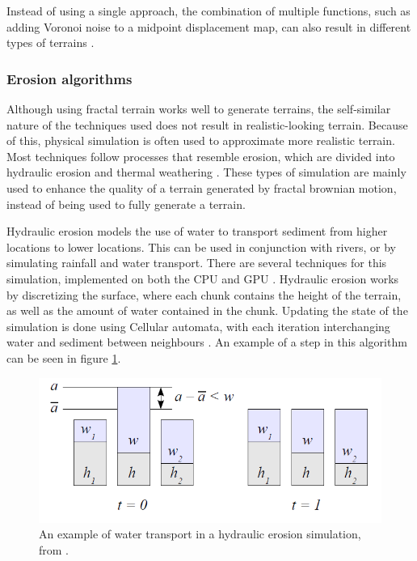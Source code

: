 \documentclass{article}
\begin{document}
Instead of using a single approach, the combination of multiple functions, such as adding Voronoi noise to a midpoint displacement map, can also result in different types of terrains \cite{olsen_realtime_2004}.

\subsubsection{Erosion algorithms}
Although using fractal terrain works well to generate terrains, the self-similar nature of the techniques used does not result in realistic-looking terrain. Because of this, physical simulation is often used to approximate more realistic terrain. Most techniques follow processes that resemble erosion, which are divided into hydraulic erosion and thermal weathering \cite{musgrave_synthesis_1989}. These types of simulation are mainly used to enhance the quality of a terrain generated by fractal brownian motion, instead of being used to fully generate a terrain.

Hydraulic erosion models the use of water to transport sediment from higher locations to lower locations. This can be used in conjunction with rivers, or by simulating rainfall and water transport. There are several techniques for this simulation, implemented on both the CPU and GPU \cite{benes_visual_2002} \cite{stava_interactive_2008}. Hydraulic erosion works by discretizing the surface, where each chunk contains the height of the terrain, as well as the amount of water contained in the chunk. Updating the state of the simulation is done using Cellular automata, with each iteration interchanging water and sediment between neighbours \cite{dambrosio_cellular_2001}. An example of a step in this algorithm can be seen in figure \ref{fig:hydraulic-erosion}.

\begin{figure}
    \centering
    \includegraphics[width=\textwidth]{figures/Hydraulic_erosion.PNG}
    \caption{An example of water transport in a hydraulic erosion simulation, from \cite{olsen_realtime_2004}.}
    \label{fig:hydraulic-erosion}
\end{figure}
\end{document}
